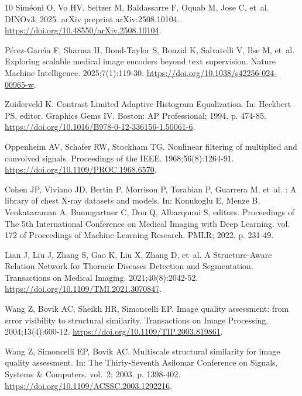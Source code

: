 \begin{thebibliography}{10}
Sim{\'e}oni O, Vo HV, Seitzer M, Baldassarre F, Oquab M, Jose C, et~al.
  {DINOv3}; 2025.
\newblock arXiv preprint arXiv:2508.10104.
\newblock \url{https://doi.org/10.48550/arXiv.2508.10104}.

P{\'e}rez-Garc{\'\i}a F, Sharma H, Bond-Taylor S, Bouzid K, Salvatelli V, Ilse
  M, et~al.
\newblock Exploring scalable medical image encoders beyond text supervision.
\newblock Nature Machine Intelligence. 2025;7(1):119-30.
\newblock \url{https://doi.org/10.1038/s42256-024-00965-w}.

Zuiderveld K.
\newblock Contrast Limited Adaptive Histogram Equalization.
\newblock In: Heckbert PS, editor. Graphics Gems {IV}. Boston: AP Professional;
  1994. p. 474-85.
\newblock \url{https://doi.org/10.1016/B978-0-12-336156-1.50061-6}.

Oppenheim AV, Schafer RW, Stockham TG.
\newblock Nonlinear filtering of multiplied and convolved signals.
\newblock Proceedings of the {IEEE}. 1968;56(8):1264-91.
\newblock \url{https://doi.org/10.1109/PROC.1968.6570}.

Cohen JP, Viviano JD, Bertin P, Morrison P, Torabian P, Guarrera M, et~al.
: A library of chest {X}-ray datasets and models.
\newblock In: Konukoglu E, Menze B, Venkataraman A, Baumgartner C, Dou Q,
  Albarqouni S, editors. Proceedings of The 5th International Conference on
  Medical Imaging with Deep Learning. vol. 172 of Proceedings of Machine
  Learning Research. PMLR; 2022. p. 231-49.

Lian J, Liu J, Zhang S, Gao K, Liu X, Zhang D, et~al.
\newblock A Structure-Aware Relation Network for Thoracic Diseases Detection
  and Segmentation.
 Transactions on Medical Imaging. 2021;40(8):2042-52.
\newblock \url{https://doi.org/10.1109/TMI.2021.3070847}.

Wang Z, Bovik AC, Sheikh HR, Simoncelli EP.
\newblock Image quality assessment: from error visibility to structural
  similarity.
 Transactions on Image Processing. 2004;13(4):600-12.
\newblock \url{https://doi.org/10.1109/TIP.2003.819861}.

Wang Z, Simoncelli EP, Bovik AC.
\newblock Multiscale structural similarity for image quality assessment.
\newblock In: The Thirty-Seventh Asilomar Conference on Signals, Systems \&
  Computers. vol.~2; 2003. p. 1398-402.
\newblock \url{https://doi.org/10.1109/ACSSC.2003.1292216}.


\end{thebibliography}
